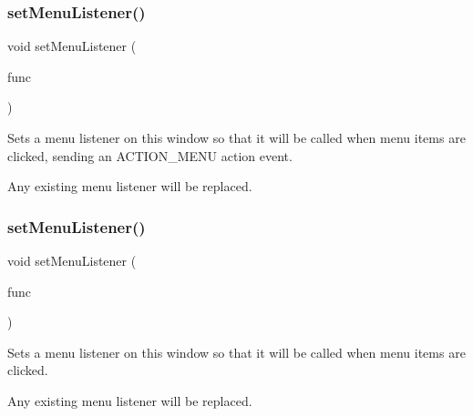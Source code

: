 \subsubsection{\texorpdfstring{set\+Menu\+Listener()}{setMenuListener()}\hspace{0.1cm}{\footnotesize\ttfamily [1/2]}}
{\footnotesize\ttfamily void set\+Menu\+Listener (\begin{DoxyParamCaption}\item[{\mbox{\hyperlink{namespacesgl_ae9f3e9eab70035da1a2b114e21357b25}{G\+Event\+Listener}}}]{func }\end{DoxyParamCaption})\hspace{0.3cm}{\ttfamily [virtual]}}



Sets a menu listener on this window so that it will be called when menu items are clicked, sending an A\+C\+T\+I\+O\+N\+\_\+\+M\+E\+NU action event. 

Any existing menu listener will be replaced. \mbox{\label{classsgl_1_1GWindow_a1294d48e67c30207da71c3e3ab56abde}} 
\subsubsection{\texorpdfstring{set\+Menu\+Listener()}{setMenuListener()}\hspace{0.1cm}{\footnotesize\ttfamily [2/2]}}
{\footnotesize\ttfamily void set\+Menu\+Listener (\begin{DoxyParamCaption}\item[{\mbox{\hyperlink{namespacesgl_a54427ce97bb1c2804e4fe2b0a62e8b17}{G\+Event\+Listener\+Void}}}]{func }\end{DoxyParamCaption})\hspace{0.3cm}{\ttfamily [virtual]}}



Sets a menu listener on this window so that it will be called when menu items are clicked. 

Any existing menu listener will be replaced. \mbox{\label{classsgl_1_1GWindow_a37d8dbc943f59920f705b0104f60bde2}} 
